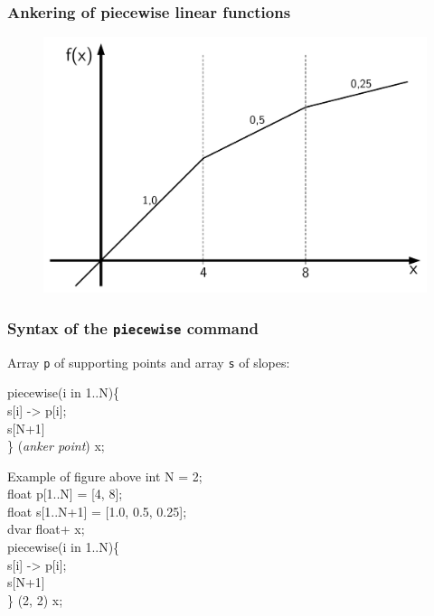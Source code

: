 \begin{frame}
 \frametitle{Ankering of piecewise linear functions}
 \begin{figure}
  \centering
  \includegraphics[width=\linewidth,page=2]{Bilder/StueckweiseLineareFunktion3}
 \end{figure}
\end{frame}

\begin{frame}
 \frametitle{Syntax of the \texttt{piecewise} command}
 Array \texttt{p} of supporting points and array \texttt{s} of slopes:
 \begin{center}
  \begin{minipage}{.5\linewidth}
   \ttfamily
    piecewise(i in 1..N)\{\\
    \mbox{}\quad s[i] -> p[i];\\
    \mbox{}\quad s[N+1]\\
    \} (\textsf{\slshape anker point}) x;\\
  \end{minipage}
 \end{center}
 \vspace{-3ex}
 \begin{block}{Example of figure above}\ttfamily\footnotesize
  int N = 2;\\
  float p[1..N] = [4, 8];\\
  float s[1..N+1] = [1.0, 0.5, 0.25];\\
  dvar float+ x;\\[2ex]  
  piecewise(i in 1..N)\{\\
    \quad s[i] -> p[i];\\
    \quad s[N+1]\\
  \} (2, 2) x;\\
 \end{block}
\end{frame}

